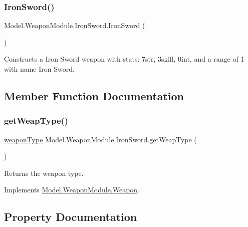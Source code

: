 \subsubsection{\texorpdfstring{Iron\+Sword()}{IronSword()}}
{\footnotesize\ttfamily Model.\+Weapon\+Module.\+Iron\+Sword.\+Iron\+Sword (\begin{DoxyParamCaption}{ }\end{DoxyParamCaption})\hspace{0.3cm}{\ttfamily [inline]}}

Constructs a Iron Sword weapon with stats\+: 7str, 3skill, 0int, and a range of 1 with name Iron Sword. 

\subsection{Member Function Documentation}
\hypertarget{class_model_1_1_weapon_module_1_1_iron_sword_a886800dd0c3fbebebbf410dab9f91454}{}\label{class_model_1_1_weapon_module_1_1_iron_sword_a886800dd0c3fbebebbf410dab9f91454} 
\subsubsection{\texorpdfstring{get\+Weap\+Type()}{getWeapType()}}
{\footnotesize\ttfamily \hyperlink{namespace_model_1_1_weapon_module_a3390c266f89e3399c2bc7fa31f13cbec}{weapon\+Type} Model.\+Weapon\+Module.\+Iron\+Sword.\+get\+Weap\+Type (\begin{DoxyParamCaption}{ }\end{DoxyParamCaption})\hspace{0.3cm}{\ttfamily [inline]}}

Returns the weapon type. 

Implements \hyperlink{interface_model_1_1_weapon_module_1_1_weapon_a175133855ef446d3d87c70d13979be9c}{Model.\+Weapon\+Module.\+Weapon}.



\subsection{Property Documentation}
\hypertarget{class_model_1_1_weapon_module_1_1_iron_sword_ab0cfe8f4f6c606284d0e7c91b1696fc7}{}\label{class_model_1_1_weapon_module_1_1_iron_sword_ab0cfe8f4f6c606284d0e7c91b1696fc7} 
